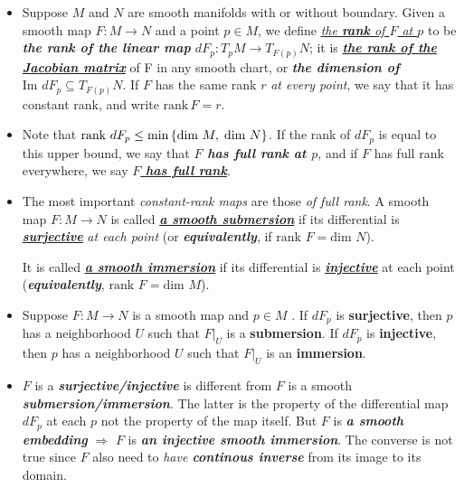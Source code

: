 \documentclass[11pt]{article}
\begin{document}
\begin{itemize}
\item \begin{definition}
Suppose $M$ and $N$ are smooth manifolds with or without boundary. Given a smooth map $F: M \rightarrow N$ and a point $p \in M$, we define \underline{\emph{the \textbf{rank} of $F$ at $p$}} to be \emph{\textbf{the rank of the linear map} $dF_p: T_{p}M \rightarrow T_{F(p)}N$}; it is \underline{\emph{\textbf{the rank of the Jacobian matrix}}} of F in any smooth chart, or \emph{\textbf{the dimension of}} $\text{Im }dF_p \subseteq T_{F(p)}N$. If $F$ has the same rank $r$ \emph{at every point}, we say that it has constant rank, and write \underline{$\text{rank}\,F = r$}.
\end{definition}

\item \begin{definition}
Note that $\text{rank }dF_{p} \le \min\left\{\text{dim }M, \; \text{dim }N\right\}$. If the rank of $dF_p$ is equal to this upper bound, we say that \emph{\textbf{$F$ has full rank at $p$}}, and if $F$ has full rank everywhere, we say \underline{\emph{\textbf{$F$ has full rank}}}.
\end{definition}

\item \begin{definition}
The most important \emph{constant-rank maps} are those \emph{of full rank}. A smooth map $F: M \rightarrow N$ is called \underline{\emph{\textbf{a smooth submersion}}} if its differential is \underline{\emph{\textbf{surjective}}} \emph{at each point} (or \emph{\textbf{equivalently}}, if \underline{$\text{rank }F = \text{dim }N$}). 

It is called \underline{\emph{\textbf{a smooth immersion}}} if its differential is \underline{\emph{\textbf{injective}}} at each point (\emph{\textbf{equivalently}}, \underline{$\text{rank }F = \text{dim }M$}).
\end{definition}

\item \begin{proposition}
Suppose $F: M \rightarrow N$ is a smooth map and $p \in M$ . If $dF_p$ is \textbf{surjective}, then $p$ has a neighborhood $U$ such that $F|_{U}$ is a \textbf{submersion}. If $dF_p$ is \textbf{injective}, then $p$ has a neighborhood $U$ such that $F|_{U}$ is an \textbf{immersion}.
\end{proposition}

\item \begin{remark}
$F$ is a \emph{\textbf{surjective/injective}} is different from $F$ is a smooth \emph{\textbf{submersion/immersion}}. The latter is the property of the differential map $dF_p$ at each $p$ not the property of the map itself.  But $F$ is \emph{\textbf{a smooth embedding}} $\Rightarrow$ $F$ is \emph{\textbf{an injective smooth immersion}}. The converse is not true since $F$ also need to \emph{have \textbf{continous inverse}} from its image to its domain.
\end{remark}
\end{itemize}
\end{document}
